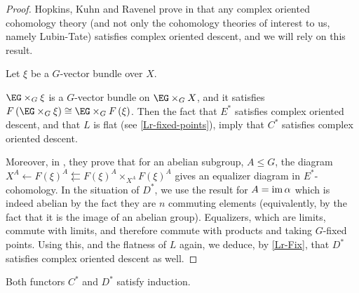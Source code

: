\begin{proof}
	Hopkins, Kuhn and Ravenel prove in \cite[2.5]{HKR} that any complex oriented cohomology theory (and not only the cohomology theories of interest to us, namely Lubin-Tate) satisfies complex oriented descent, and we will rely on this result.
	
	Let $\xi$ be a $G$-vector bundle over $X$.
	
	$\EG \times_G \xi$ is a $G$-vector bundle on $\EG \times_G X$, and it satisfies $F\left(\EG \times_G \xi\right) \cong \EG \times_G F\left(\xi\right)$.
	Then the fact that $E^*$ satisfies complex oriented descent, and that $L$ is flat (see \ref{Lr-fixed-points}), imply that $C^*$ satisfies complex oriented descent.
	
	Moreover, in \cite[2.6]{HKR}, they prove that for an abelian subgroup, $A \leq G$, the diagram $X^A \leftarrow F\left(\xi\right)^A \leftleftarrows F\left(\xi\right)^A \times_{X^A} F\left(\xi\right)^A$ gives an equalizer diagram in $E^*$-cohomology.
	In the situation of $D^*$, we use the result for $A = \operatorname{im} \alpha$ which is indeed abelian by the fact they are $n$ commuting elements (equivalently, by the fact that it is the image of an abelian group).
	Equalizers, which are limits, commute with limits, and therefore commute with products and taking $G$-fixed points.
	Using this, and the flatness of $L$ again, we deduce, by \ref{Lr-Fix}, that $D^*$ satisfies complex oriented descent as well.
\end{proof}

\begin{lemma}
	Both functors $C^*$ and $D^*$ satisfy induction.
\end{lemma}

